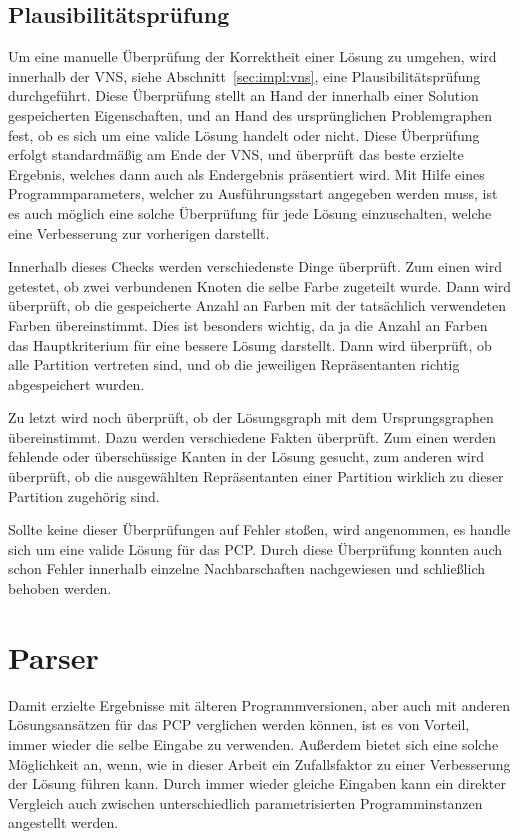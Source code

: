 \subsection{Plausibilitätsprüfung}

Um eine manuelle Überprüfung der Korrektheit einer Lösung zu umgehen, wird innerhalb der VNS, siehe Abschnitt~\ref{sec:impl:vns}, eine Plausibilitätsprüfung durchgeführt. Diese Überprüfung stellt an Hand 
der innerhalb einer Solution gespeicherten Eigenschaften, und an Hand des ursprünglichen Problemgraphen fest, ob es sich um eine valide Lösung handelt oder nicht. Diese Überprüfung erfolgt standardmäßig
am Ende der VNS, und überprüft das beste erzielte Ergebnis, welches dann auch als Endergebnis präsentiert wird. Mit Hilfe eines Programmparameters, welcher zu Ausführungsstart angegeben werden muss, ist es
auch möglich eine solche Überprüfung für jede Lösung einzuschalten, welche eine Verbesserung zur vorherigen darstellt. 

Innerhalb dieses Checks werden verschiedenste Dinge überprüft. Zum einen wird getestet, ob zwei verbundenen Knoten die selbe Farbe zugeteilt wurde. Dann wird überprüft, ob die gespeicherte Anzahl an Farben
mit der tatsächlich verwendeten Farben übereinstimmt. Dies ist besonders wichtig, da ja die Anzahl an Farben das Hauptkriterium für eine bessere Lösung darstellt. Dann wird überprüft, ob alle Partition
vertreten sind, und ob die jeweiligen Repräsentanten richtig abgespeichert wurden. 

Zu letzt wird noch überprüft, ob der Lösungsgraph mit dem Ursprungsgraphen übereinstimmt. Dazu werden verschiedene Fakten überprüft. Zum einen werden fehlende oder überschüssige Kanten in der Lösung gesucht, 
zum anderen wird überprüft, ob die ausgewählten Repräsentanten einer Partition wirklich zu dieser Partition zugehörig sind. 

Sollte keine dieser Überprüfungen auf Fehler stoßen, wird angenommen, es handle sich um eine valide Lösung für das PCP. Durch diese Überprüfung konnten auch schon Fehler innerhalb einzelne Nachbarschaften 
nachgewiesen und schließlich behoben werden.


\section{Parser}
\label{sec:parser}

Damit erzielte Ergebnisse mit älteren Programmversionen, aber auch mit anderen Lösungs\-ansätzen für das PCP verglichen werden können, ist es von
Vorteil, immer wieder die selbe Eingabe zu verwenden. Außerdem bietet sich eine solche Möglichkeit an, wenn, wie in dieser Arbeit ein Zufallsfaktor
zu einer Verbesserung der Lösung führen kann. Durch immer wieder gleiche Eingaben kann ein direkter Vergleich auch zwischen unterschiedlich
parametrisierten Programminstanzen angestellt werden.

